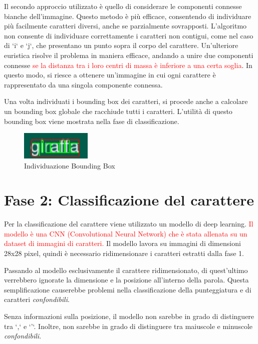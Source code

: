 Il secondo approccio utilizzato è quello di considerare le componenti connesse bianche dell'immagine. Questo metodo è più efficace, consentendo di individuare più facilmente caratteri diversi, anche se parzialmente sovrapposti. L'algoritmo non consente di individuare correttamente i caratteri non contigui, come nel caso di `i` e `j`, che presentano un punto sopra il corpo del carattere. Un'ulteriore euristica risolve il problema in maniera efficace, andando a unire due componenti connesse \textcolor{red}{se la distanza tra i loro centri di massa è inferiore a una certa soglia}. In questo modo, si riesce a ottenere un'immagine in cui ogni carattere è rappresentato da una singola componente connessa.
\newline

Una volta individuati i bounding box dei caratteri, si procede anche a calcolare un bounding box globale che racchiude tutti i caratteri. L'utilità di questo bounding box viene mostrata nella fase di classificazione.

\begin{figure}[H]
	\centering
	\includegraphics[width=0.3\textwidth]{images/giraffa-bb.jpeg}
	\caption{Individuazione Bounding Box}
	\label{fig:screenshot}
\end{figure}

\section{Fase 2: Classificazione del carattere}

Per la classificazione del carattere viene utilizzato un modello di deep learning. \textcolor{red}{Il modello è una CNN (Convolutional Neural Network) che è stata allenata su un dataset di immagini di caratteri.}
Il modello lavora su immagini di dimensioni 28x28 pixel, quindi è necessario ridimensionare i caratteri estratti dalla fase 1.


Passando al modello esclusivamente il carattere ridimensionato, di quest'ultimo verrebbero ignorate la dimensione e la posizione all'interno della parola. Questa semplificazione causerebbe problemi nella classificazione della punteggiatura e di caratteri \emph{confondibili}.

Senza informazioni sulla posizione, il modello non sarebbe in grado di distinguere tra `,` e `'`. Inoltre, non sarebbe in grado di distinguere tra maiuscole e minuscole \emph{confondibili}.
\newline

